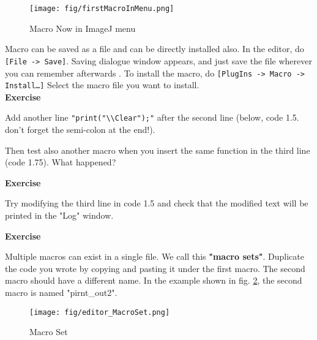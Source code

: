 \documentclass[11pt,a4paper,oneside]{report}
\newenvironment{indentexercise}[1]%
{{\setlength{\leftmargin}{2em}}%
\textbf{Exercise \thesubsection-#1}%
\begin{list}{}%
	\item%
}
{\end{list}}
\newcommand{\ijmenu}[1]{\texttt{\small#1}}
\begin{document}
\begin{figure}[htbp]
\begin{center}
\texttt{[image: fig/firstMacroInMenu.png]}
\caption{Macro Now in ImageJ menu} \label{fig_MacroInMenu}
\end{center}
\end{figure}

Macro can be saved as a file and can be directly installed also. 
In the editor, do \ijmenu{[File -> Save]}. Saving dialogue window appears, 
and just save the file wherever you can remember afterwards . 
To install the macro, do \ijmenu{[PlugIns -> Macro -> Install\ldots]} 
Select the macro file you want to install.\\

\begin{indentexercise}{1}
\item Add another line \texttt{"print("\textbackslash{}\textbackslash{}Clear");"} 
after the second line (below, code 1.5. don't forget the semi-colon at the end!). 
\item 
Then test also another macro when you insert the same function in the third line (code 1.75). 
What happened?  
\item 
\end{indentexercise}

\begin{indentexercise}{2}
\item Try modifying the third line in code 1.5 
and check that the modified text will be printed in the "Log" window. \\
\end{indentexercise}

\begin{indentexercise}{3}
\item Multiple macros can exist in a single file. We call this \textbf{"macro sets"}. 
Duplicate the code you wrote by copying and pasting it under the first macro. 
The second macro should have a different name. In the example shown in fig.
\ref{fig_MacroSetInMenu}, the second macro is named "pirnt\_out2".
\end{indentexercise}

\begin{figure}[h!]
\begin{center}
\texttt{[image: fig/editor\_MacroSet.png]}
\caption{Macro Set} \label{fig_MacroSetInMenu}
\end{center}
\end{figure}
\end{document}
